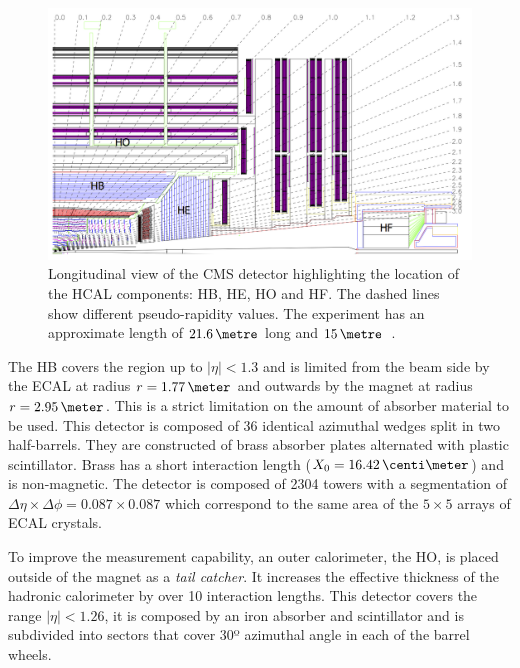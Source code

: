 \begin{figure}[!htb]
  \centering
  \includegraphics[width=1.0\textwidth]{Chapter02/CMS/Images/CMS_HCAL_Layout.png}
  \caption[Longitudinal view of the CMS detector highlighting the location of the HCAL components: HB, HE, HO and HF.]
  {Longitudinal view of the \gls{CMS} detector highlighting the location of the \gls{HCAL} components: \gls{HB}, \gls{HE}, \gls{HO} and \gls{HF}. The dashed lines show different pseudo-rapidity values. The experiment has an approximate length of  $21.6\,\metre$ long and $15\,\metre$~\cite{ARTICLE:TheCMSExperiment}.}
  \label{FIGURE:ExperimentalApparatus_CMS_HCAL_Layout}
\end{figure}

The \acrfull{HB} covers the region up to $|\eta|<1.3$ and is limited from the beam side by the \gls{ECAL} at radius $r=1.77\,\meter$ and outwards by the magnet at radius $r=2.95\,\meter$. This is a strict limitation on the amount of absorber material to be used. This detector is composed of 36 identical azimuthal wedges split in two half-barrels. They are constructed of brass absorber plates alternated with plastic scintillator. Brass has a short interaction length ($X_0=16.42\,\centi\meter$) and is non-magnetic. The detector is composed of 2304 towers with a segmentation of $\Delta\eta \times \Delta\phi = 0.087 \times 0.087$ which correspond to the same area of the $5 \times 5$ arrays of \gls{ECAL} crystals.

To improve the measurement capability, an outer calorimeter, the \acrfull{HO}, is placed outside of the magnet as a \textit{tail catcher}. It increases the effective thickness of the hadronic calorimeter by over 10 interaction lengths. This detector covers the range $|\eta|<1.26$, it is composed by an iron absorber and scintillator and is subdivided into sectors that cover 30º azimuthal angle in each of the barrel wheels. 

